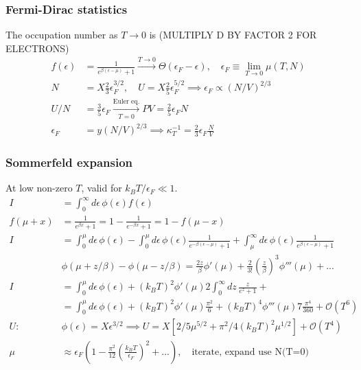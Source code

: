 \documentclass[a4paper, english, 12pt]{article}
\newcommand{\eps}{\epsilon}
\newcommand{\closed}[1]{\left( #1 \right)}
\begin{document}
\begin{multicols*}{2}
\subsubsection*{\scriptsize Fermi-Dirac statistics}
The occupation number as $T\to0$ is (MULTIPLY D BY FACTOR 2 FOR ELECTRONS) 
\begin{align*}
    f(\eps)&=\frac{1}{e^{\beta(\eps-\mu)} +1} \xrightarrow{T\to0} \Theta(\eps_F-\eps),\quad \eps_F\equiv \lim_{T\to0}\mu(T,N) \\
    N&= X \frac{2}{3} \eps_F^{3/2},\quad U=X \frac{2}{5} \eps_F^{5/2} \implies \eps_F  \propto (N/V)^{2/3} \\
    U/N &= \frac{3}{5}\eps_F \xrightarrow[T=0]{\text{Euler eq.}} PV=\frac{2}{5}\eps_F N \\ 
    \eps_F &= y(N/V)^{2/3}\implies \kappa_T^{-1}= \frac{2}{3}\eps_F \frac{N}{V}
\end{align*}


\subsubsection*{\scriptsize Sommerfeld expansion}
At low non-zero $T$, valid for $k_B T/\eps_F\ll1$. 
\begin{align*}
    I &= \int_0^\infty d\eps\, \phi(\eps) f(\eps) \\    
    f(\mu+x) &= \frac{1}{e^{\beta x}+1} = 1 - \frac{1}{e^{-\beta x}+1} = 1-f(\mu-x) \\
    I &=\int_0^\mu d\eps\, \phi(\eps) - \int_0^\mu d\eps\, \phi(\eps)\frac{1}{e^{-\beta(\eps-\mu)} +1 } + \int_\mu^\infty d\eps\, \phi(\eps) \frac{1}{e^{\beta(\eps-\mu)} +1} \\
    &\phi(\mu+z/\beta) - \phi(\mu-z/\beta) = \frac{2z}{\beta}\phi'(\mu) + \frac{2}{3!}\closed{\frac{z}{\beta}}^3 \phi'''(\mu)+... \\
    I&= \int_0^\mu d\eps\, \phi(\eps) + (k_B T)^2 \phi'(\mu) 2 \int_{0}^\infty dz\, \frac{z}{e^z+1} + \\ 
    &= \int_0^\mu d\eps\, \phi(\eps) + (k_B T)^2 \phi'(\mu) \frac{\pi^2}{6} + (k_B T)^4 \phi'''(\mu) 7 \frac{\pi^4}{360} + \mathcal{O}(T^6) \\
    U:\:&\phi(\eps)=X\eps^{3/2}\implies U=X[2/5 \mu^{5/2} + \pi^2/4 (k_B T)^2 \mu^{1/2}] + \mathcal{O}(T^4) \\
    \mu &\approx \eps_F \closed{1 - \frac{\pi^2}{12} \closed{\frac{k_B T}{\eps_F}}^2+...},\quad\text{iterate, expand use N(T=0)}
\end{align*}


\end{multicols*}
\end{document}
